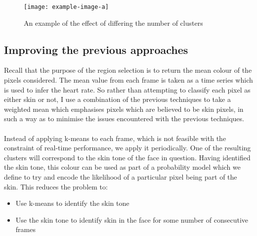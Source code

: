 \begin{figure}[!h]
    \texttt{[image: example-image-a]}
   \caption{An example of the effect of differing the number of clusters} 
\end{figure}


\subsection{Improving the previous approaches}
Recall that the purpose of the region selection is to return the mean colour of the pixels considered. The mean value from each frame is taken as a time series which is used to infer the heart rate. So rather than attempting to classify each pixel as either skin or not, I use a combination of the previous techniques to take a weighted mean which emphasises pixels which are believed to be skin pixels, in such a way as to minimise the issues encountered with the previous techniques.
\\ \\
Instead of applying k-means to each frame, which is not feasible with the constraint of real-time performance, we apply it periodically. One of the resulting clusters will correspond to the skin tone of the face in question.
Having identified the skin tone, this colour can be used as part of a probability model which we define to try and encode the likelihood of a particular pixel being part of the skin. This reduces the problem to: 
\begin{itemize}
   \item Use k-means to identify the skin tone
   \item Use the skin tone to identify skin in the face for some number of consecutive frames 
\end{itemize}
